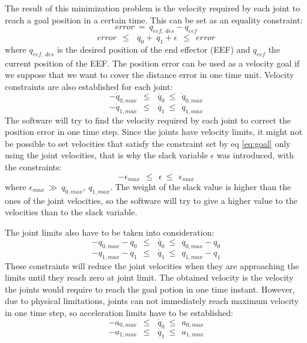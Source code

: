 The result of this minimization problem is the velocity required by each joint to reach a goal position in a certain time. This can be set as an equality constraint:
\begin{equation}
error\ =\ q_{eef,\ des} - q_{eef}
\label{eq:init_error}
\end{equation}
\begin{equation}
error\ \ \leq\ \ \dot{\ q_{0}} + \dot{\ q_{1}} + \epsilon\ \ \leq\ \ error
\label{eq:goal}
\end{equation}
where $q_{eef,\ des}$ is the desired position of the end effector (EEF) and $q_{eef}$ the current position of the EEF. The position error can be used as a velocity goal if we suppose that we want to cover the distance error in one time unit. Velocity constraints are also established for each joint:
\begin{equation}
-\dot{q}_{0,max}\ \ \leq\ \ \dot{\ q_{0}}\ \leq\ \ \dot{q}_{0,max}
\end{equation}
\begin{equation}
-\dot{q}_{1,max}\ \ \leq\ \ \dot{\ q_{1}}\ \leq\ \ \dot{q}_{1,max}
\end{equation}
The software will try to find the velocity required by each joint to correct the position error in one time step. Since the joints have velocity limits, it might not be possible to set velocities that satisfy the constraint set by eq \ref{eq:goal} only using the joint velocities, that is why the slack variable $\epsilon$ was introduced, with the constraints: 
\begin{equation}
-\epsilon_{max}\ \ \leq\ \ \epsilon\ \leq\ \ \epsilon_{max}
\end{equation}
where $\epsilon_{max}\ \gg\ q_{0,max},\ q_{1,max}$. The weight of the slack value is higher than the ones of the joint velocities, so the software will try to give a higher value to the velocities than to the slack variable.

The joint limits also have to be taken into consideration:
\begin{equation}
-q_{0,max} - q_{0}\ \ \leq\ \ \dot{\ q_{0}}\ \leq\ \ q_{0,max} - q_{0}
\end{equation}
\begin{equation}
-q_{1,max} - q_{1}\ \ \leq\ \ \dot{\ q_{1}}\ \leq\ \ q_{1,max} - q_{1}
\end{equation}
These constraints will reduce the joint velocities when they are approaching the limits until they reach zero at joint limit. The obtained velocity is the velocity the joints would require to reach the goal potion in one time instant. However, due to physical limitations, joints can not immediately reach maximum velocity in one time step, so acceleration limits have to be established:
\begin{equation}
-a_{0,max}\ \ \leq\ \ \dot{\ q_{0}}\ \leq\ \ a_{0,max}
\label{eq:accel0}
\end{equation}
\begin{equation}
-a_{1,max}\ \ \leq\ \ \dot{\ q_{1}}\ \leq\ \ a_{1,max}
\label{eq:accel1}
\end{equation}

